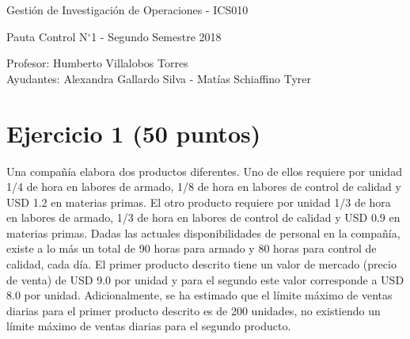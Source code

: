 \documentclass[letterpaper,11pt,oneside]{article}
\newcommand{\grad}{$^{\circ}$}
\begin{document}
	\begin{center}
		{\Large Gestión de Investigación de Operaciones - ICS010}
		\par {\large Pauta Control N\grad 1 - Segundo Semestre 2018}
	\end{center}

	\begin{center}
		Profesor: Humberto Villalobos Torres\\
		Ayudantes: Alexandra Gallardo Silva - Matías Schiaffino Tyrer
	\end{center}
	
\section*{Ejercicio 1 (50 puntos)}

Una compañía elabora dos productos diferentes. Uno de ellos requiere por unidad 1/4 de hora en labores de armado, 1/8 de hora en labores de control de calidad y USD 1.2 en materias primas. El otro producto requiere por unidad 1/3 de hora en labores de armado, 1/3 de hora en labores de control de calidad y USD 0.9 en materias primas. Dadas las actuales disponibilidades de personal en la compañía, existe a lo más un total de 90 horas para armado y 80 horas para control de calidad, cada día. El primer producto descrito tiene un valor de mercado (precio de venta) de USD 9.0 por unidad y para el segundo este valor corresponde a USD 8.0 por unidad. Adicionalmente, se ha estimado que el límite máximo de ventas diarias para el primer producto descrito es de 200 unidades, no existiendo un límite máximo de ventas diarias para el segundo producto.
\end{document}
